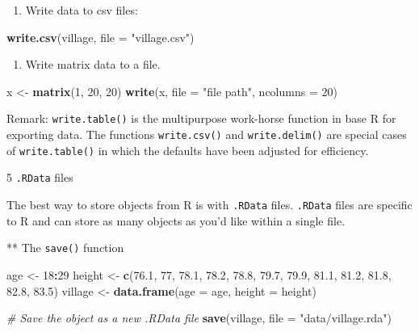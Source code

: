 \documentclass[]{book}
\newenvironment{Shaded}{\begin{snugshade}}{\end{snugshade}}
\newcommand{\KeywordTok}[1]{\textcolor[rgb]{0.13,0.29,0.53}{\textbf{#1}}}
\newcommand{\DataTypeTok}[1]{\textcolor[rgb]{0.13,0.29,0.53}{#1}}
\newcommand{\DecValTok}[1]{\textcolor[rgb]{0.00,0.00,0.81}{#1}}
\newcommand{\FloatTok}[1]{\textcolor[rgb]{0.00,0.00,0.81}{#1}}
\newcommand{\StringTok}[1]{\textcolor[rgb]{0.31,0.60,0.02}{#1}}
\newcommand{\CommentTok}[1]{\textcolor[rgb]{0.56,0.35,0.01}{\textit{#1}}}
\newcommand{\OperatorTok}[1]{\textcolor[rgb]{0.81,0.36,0.00}{\textbf{#1}}}
\newcommand{\NormalTok}[1]{#1}
\providecommand{\tightlist}{%
  \setlength{\itemsep}{0pt}\setlength{\parskip}{0pt}}
\begin{document}
\begin{enumerate}
\def\labelenumi{\arabic{enumi}.}
\setcounter{enumi}{2}
\tightlist
\item
  Write data to csv files:
\end{enumerate}

\begin{Shaded}
\begin{Highlighting}[]
\KeywordTok{write.csv}\NormalTok{(village, }\DataTypeTok{file =} \StringTok{"village.csv"}\NormalTok{)}
\end{Highlighting}
\end{Shaded}

\begin{enumerate}
\def\labelenumi{\arabic{enumi}.}
\setcounter{enumi}{3}
\tightlist
\item
  Write matrix data to a file.
\end{enumerate}

\begin{Shaded}
\begin{Highlighting}[]
\NormalTok{x <-}\StringTok{ }\KeywordTok{matrix}\NormalTok{(}\DecValTok{1}\NormalTok{, }\DecValTok{20}\NormalTok{, }\DecValTok{20}\NormalTok{)}
\KeywordTok{write}\NormalTok{(x, }\DataTypeTok{file =} \StringTok{"file path"}\NormalTok{, }\DataTypeTok{ncolumns =} \DecValTok{20}\NormalTok{)}
\end{Highlighting}
\end{Shaded}

Remark: \texttt{write.table()} is the multipurpose work-horse function
in base R for exporting data. The functions \texttt{write.csv()} and
\texttt{write.delim()} are special cases of \texttt{write.table()} in
which the defaults have been adjusted for efficiency.

5 \texttt{.RData} files

The best way to store objects from R is with \texttt{.RData} files.
\texttt{.RData} files are specific to R and can store as many objects as
you'd like within a single file.

** The \texttt{save()} function

\begin{Shaded}
\begin{Highlighting}[]
\NormalTok{age <-}\StringTok{ }\DecValTok{18}\OperatorTok{:}\DecValTok{29}
\NormalTok{height <-}\StringTok{ }\KeywordTok{c}\NormalTok{(}\FloatTok{76.1}\NormalTok{, }\DecValTok{77}\NormalTok{, }\FloatTok{78.1}\NormalTok{, }\FloatTok{78.2}\NormalTok{, }\FloatTok{78.8}\NormalTok{, }\FloatTok{79.7}\NormalTok{, }\FloatTok{79.9}\NormalTok{, }\FloatTok{81.1}\NormalTok{, }\FloatTok{81.2}\NormalTok{, }
            \FloatTok{81.8}\NormalTok{, }\FloatTok{82.8}\NormalTok{, }\FloatTok{83.5}\NormalTok{)}
\NormalTok{village <-}\StringTok{ }\KeywordTok{data.frame}\NormalTok{(}\DataTypeTok{age =}\NormalTok{ age, }\DataTypeTok{height =}\NormalTok{ height)}

\CommentTok{# Save the object as a new .RData file}
\KeywordTok{save}\NormalTok{(village, }\DataTypeTok{file =} \StringTok{"data/village.rda"}\NormalTok{)}
\end{Highlighting}
\end{Shaded}
\end{document}
